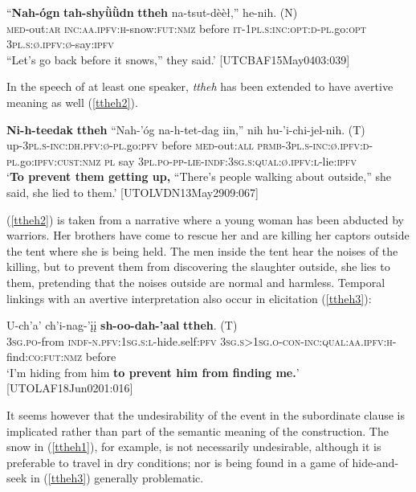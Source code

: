 \documentclass[output=paper,colorlinks,citecolor=brown]{langscibook}
\begin{document}
\ea
\label{ttheh1}
\gll ``\textbf{Nah-ógn} \textbf{tah-shyǜǜdn} \textbf{ttheh} na-tsut-dèèł,'' {he-nih. \textnormal{(N)}} \\
\textsc{med}-out:\textsc{ar} \textsc{inc:aa.ipfv:h}-snow:\textsc{fut:nmz} before \textsc{it-1pl.s:inc:opt:d-pl}.go:\textsc{opt} \textsc{3pl.s:ø.ipfv:ø}-say:\textsc{ipfv} \\
``Let's go back before it snows,'' they said.' \hfill [UTCBAF15May0403:039]
\z

\noindent In the speech of at least one speaker, \textit{ttheh} has been extended to have avertive meaning as well (\ref{ttheh2}).

\ea
\label{ttheh2}
\gll \textbf{Ni-h-teedak} \textbf{ttheh} ``Nah-'óg na-h-tet-dag iin,'' nih {hu-'i-chi-jel-nih. \textnormal{(T)}} \\
up-\textsc{3pl.s-inc:dh.pfv:ø-pl}.go:\textsc{pfv} before \textsc{med}-out:\textsc{all} \textsc{prmb-3pl.s-inc:ø.ipfv:d-pl}.go:\textsc{ipfv:cust:nmz} \textsc{pl} say \textsc{3pl.po-pp-lie-indf:3sg.s:qual:ø.ipfv:l}-lie:\textsc{ipfv} \\
\glt `\textbf{To prevent them getting up,} ``There's people walking about outside,'' she said, she lied to them.' \hfill [UTOLVDN13May2909:067]
\z

\noindent (\ref{ttheh2}) is taken from a narrative where a young woman has been abducted by warriors. Her brothers have come to rescue her and are killing her captors outside the tent where she is being held. The men inside the tent hear the noises of the killing, but to prevent them from discovering the slaughter outside, she lies to them, pretending that the noises outside are normal and harmless. Temporal linkings with an avertive interpretation also occur in elicitation (\ref{ttheh3}):

\ea
\label{ttheh3}
\gll U-ch'a' ch'i-nag-'įį \textbf{sh-oo-dah-'aal} \textbf{ttheh}. \textnormal{(T)} \\
\textsc{3sg.po}-from \textsc{indf-n.pfv:1sg.s:l}-hide.self:\textsc{pfv} \textsc{3sg.s>1sg.o-con-inc:qual:aa.ipfv:h}-find:\textsc{co:fut:nmz} before \\
\glt `I'm hiding from him \textbf{to prevent him from finding me.}' \\ \hfill [UTOLAF18Jun0201:016]
\z 

It seems however that the undesirability of the event in the subordinate clause is implicated rather than part of the semantic meaning of the construction. The snow in (\ref{ttheh1}), for example, is not necessarily undesirable, although it is preferable to travel in dry conditions; nor is being found in a game of hide-and-seek in (\ref{ttheh3}) generally problematic. 
\end{document}

